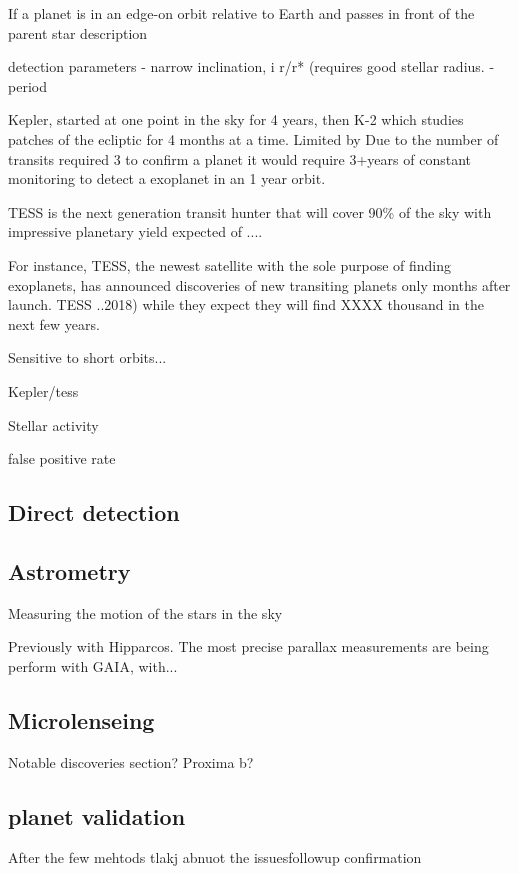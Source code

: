 If a planet is in an edge-on orbit relative to Earth and passes in front of the parent star 
description

detection parameters
- narrow inclination, i
r/r*  (requires good stellar radius.
- period

Kepler, started at one point in the sky for 4 years, then K-2 which studies patches of the ecliptic for 4 months at a time. Limited by  Due to the number of transits required 3 to confirm a planet it would require 3+years of constant monitoring to detect a exoplanet in an 1 year orbit.

TESS is the next generation transit hunter that will cover 90\% of the sky with impressive planetary yield expected of ....

For instance, TESS, the newest satellite with the sole purpose of finding exoplanets, has announced discoveries of new transiting planets only months after launch. TESS ..2018) while they expect they will find XXXX thousand in the next few years.

Sensitive to short orbits...

Kepler/tess

Stellar activity



false positive rate \citet{santerne_sophie_2012}


\subsection{Direct detection}

\subsection{Astrometry}

Measuring the motion of the stars in the sky

Previously with Hipparcos.
The most precise parallax measurements are being perform with GAIA, with...


\subsection{Microlenseing}


Notable discoveries section? Proxima b?  


\subsection{planet validation}
After the few mehtods tlakj abnuot the issuesfollowup confirmation

